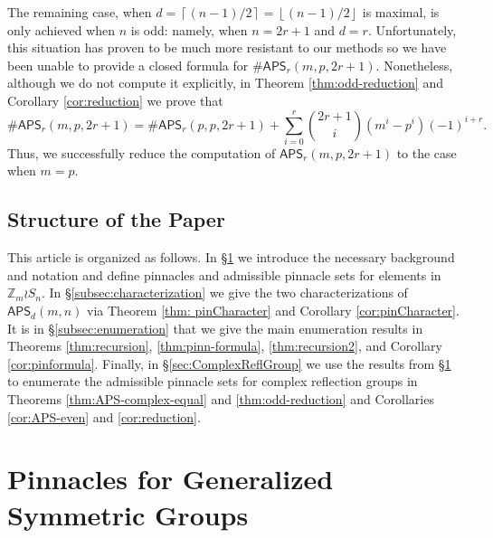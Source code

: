 \documentclass[12pt,reqno]{amsart}
\numberwithin{equation}{section}
\theoremstyle{plain}
\theoremstyle{definition}
\theoremstyle{remark}
\newcommand{\Z}{\mathbb{Z}}
\newcommand\APS{\mathsf{APS}}
\newcommand{\ceil}[1]{\left\lceil#1\right\rceil}
\newcommand{\floor}[1]{\left\lfloor#1\right\rfloor}
\begin{document}
The remaining case, when $d=\ceil{(n-1)/2}=\floor{(n-1)/2}$ is maximal, is only achieved when $n$ is odd: namely, when $n=2r+1$ and $d=r$. Unfortunately, this situation has proven to be much more resistant to our methods so we have been unable to provide a closed formula for $\#\APS_r(m,p,2r+1)$. Nonetheless, although we do not compute it explicitly, in Theorem \ref{thm:odd-reduction} and Corollary \ref{cor:reduction} we prove that 
\[
\#\APS_r(m,p,2r+1) = \#\APS_r(p,p,2r+1) + \sum_{i=0}^r\binom{2r+1}{i}(m^i-p^i)(-1)^{i+r}.
\]
Thus, we successfully reduce the computation of $\APS_r(m,p,2r+1)$ to the case when $m=p$.

\subsection*{Structure of the Paper} This article is organized as follows. In \S \ref{Sec:GeneralizedSymGroup} we introduce the necessary background and notation and define pinnacles and admissible pinnacle sets for elements in $\Z_m \wr S_n$. In \S\ref{subsec:characterization} we give the two characterizations of $\APS_d(m,n)$ via Theorem \ref{thm: pinCharacter} and Corollary \ref{cor:pinCharacter}. It is in \S\ref{subsec:enumeration} that we give the main enumeration results in Theorems \ref{thm:recursion}, \ref{thm:pinn-formula}, \ref{thm:recursion2}, and Corollary \ref{cor:pinformula}. Finally, in \S\ref{sec:ComplexReflGroup} we use the results from \S\ref{Sec:GeneralizedSymGroup} to enumerate the admissible pinnacle sets for complex reflection groups in Theorems \ref{thm:APS-complex-equal} and \ref{thm:odd-reduction} and Corollaries \ref{cor:APS-even} and \ref{cor:reduction}.


\section{Pinnacles for Generalized Symmetric Groups} \label{Sec:GeneralizedSymGroup}

 
\end{document}
